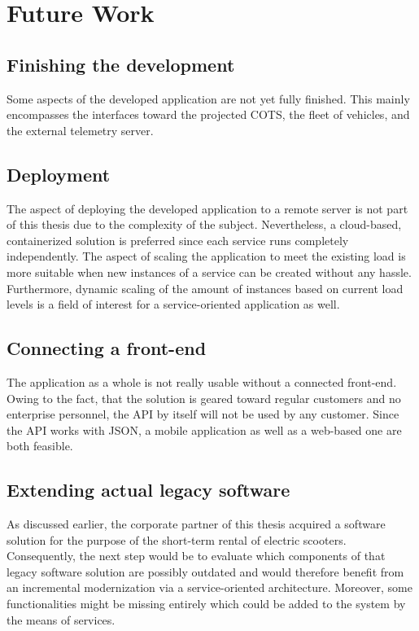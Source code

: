\documentclass[12pt,a4paper,twoside]{report}
\begin{document}
\chapter{Future Work} \label{chap:future-work}

\section{Finishing the development}

Some aspects of the developed application are not yet fully finished.
This mainly encompasses the interfaces toward the projected COTS,
the fleet of vehicles, and the external telemetry server.


\section{Deployment}

The aspect of deploying the developed application to a remote server is
not part of this thesis due to the complexity of the subject.
Nevertheless, a cloud-based, containerized solution is preferred since
each service runs completely independently. The aspect of scaling the application
to meet the existing load is more suitable when new instances of a service
can be created without any hassle. Furthermore, dynamic scaling of the amount
of instances based on current load levels is a field of interest for a
service-oriented application as well.


\section{Connecting a front-end}

The application as a whole is not really usable without a connected front-end.
Owing to the fact, that the solution is geared toward regular customers
and no enterprise personnel, the API by itself will not be used by any customer.
Since the API works with JSON, a mobile application as well as a web-based one
are both feasible.


\section{Extending actual legacy software}

As discussed earlier, the corporate partner of this thesis acquired a
software solution for the purpose of the short-term rental of electric scooters.
Consequently, the next step would be to evaluate which components of that
legacy software solution are possibly outdated and would therefore benefit
from an incremental modernization via a service-oriented architecture.
Moreover, some functionalities might be missing entirely which could be added
to the system by the means of services.
\end{document}
